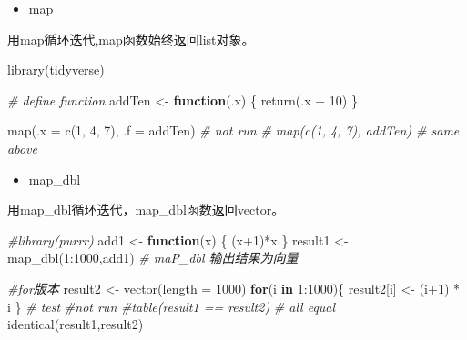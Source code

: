 \documentclass[
]{book}
\newenvironment{Shaded}{\begin{snugshade}}{\end{snugshade}}
\newcommand{\AttributeTok}[1]{\textcolor[rgb]{0.77,0.63,0.00}{#1}}
\newcommand{\CommentTok}[1]{\textcolor[rgb]{0.56,0.35,0.01}{\textit{#1}}}
\newcommand{\ControlFlowTok}[1]{\textcolor[rgb]{0.13,0.29,0.53}{\textbf{#1}}}
\newcommand{\DecValTok}[1]{\textcolor[rgb]{0.00,0.00,0.81}{#1}}
\newcommand{\FunctionTok}[1]{\textcolor[rgb]{0.00,0.00,0.00}{#1}}
\newcommand{\NormalTok}[1]{#1}
\newcommand{\OtherTok}[1]{\textcolor[rgb]{0.56,0.35,0.01}{#1}}
\newcommand{\SpecialCharTok}[1]{\textcolor[rgb]{0.00,0.00,0.00}{#1}}
\providecommand{\tightlist}{%
  \setlength{\itemsep}{0pt}\setlength{\parskip}{0pt}}
\begin{document}
\begin{itemize}
\tightlist
\item
  map
\end{itemize}

用map循环迭代,map函数始终返回list对象。

\begin{Shaded}
\begin{Highlighting}[]
\FunctionTok{library}\NormalTok{(tidyverse)}

\CommentTok{\# define function}
\NormalTok{addTen }\OtherTok{\textless{}{-}} \ControlFlowTok{function}\NormalTok{(.x) \{}
  \FunctionTok{return}\NormalTok{(.x }\SpecialCharTok{+} \DecValTok{10}\NormalTok{)}
\NormalTok{\}}

\FunctionTok{map}\NormalTok{(}\AttributeTok{.x =} \FunctionTok{c}\NormalTok{(}\DecValTok{1}\NormalTok{, }\DecValTok{4}\NormalTok{, }\DecValTok{7}\NormalTok{), }\AttributeTok{.f =}\NormalTok{ addTen)}
\CommentTok{\# not run}
\CommentTok{\# map(c(1, 4, 7), addTen) \# same above}
\end{Highlighting}
\end{Shaded}

\begin{itemize}
\tightlist
\item
  map\_dbl
\end{itemize}

用map\_dbl循环迭代，map\_dbl函数返回vector。

\begin{Shaded}
\begin{Highlighting}[]
\CommentTok{\#library(purrr)}
\NormalTok{add1 }\OtherTok{\textless{}{-}} \ControlFlowTok{function}\NormalTok{(x) \{}
\NormalTok{  (x}\SpecialCharTok{+}\DecValTok{1}\NormalTok{)}\SpecialCharTok{*}\NormalTok{x}
\NormalTok{\}}
\NormalTok{result1 }\OtherTok{\textless{}{-}} \FunctionTok{map\_dbl}\NormalTok{(}\DecValTok{1}\SpecialCharTok{:}\DecValTok{1000}\NormalTok{,add1) }\CommentTok{\# maP\_dbl 输出结果为向量}

\CommentTok{\#for版本}
\NormalTok{result2 }\OtherTok{\textless{}{-}} \FunctionTok{vector}\NormalTok{(}\AttributeTok{length =} \DecValTok{1000}\NormalTok{)}
\ControlFlowTok{for}\NormalTok{(i }\ControlFlowTok{in} \DecValTok{1}\SpecialCharTok{:}\DecValTok{1000}\NormalTok{)\{}
\NormalTok{  result2[i] }\OtherTok{\textless{}{-}}\NormalTok{ (i}\SpecialCharTok{+}\DecValTok{1}\NormalTok{) }\SpecialCharTok{*}\NormalTok{ i}
\NormalTok{\}}
\CommentTok{\# test }
\CommentTok{\#not run}
\CommentTok{\#table(result1 == result2)}
\CommentTok{\# all equal}
\FunctionTok{identical}\NormalTok{(result1,result2)}
\end{Highlighting}
\end{Shaded}
\end{document}

